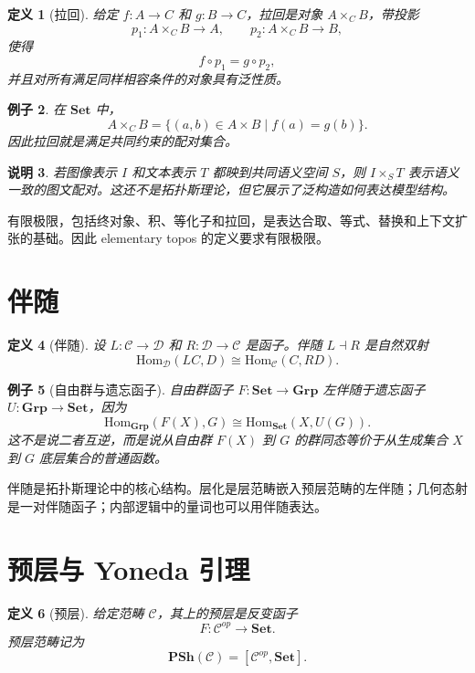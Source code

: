 \documentclass[UTF8,11pt,fontset=none]{ctexart}
\newtheorem{definition}{定义}[section]
\newtheorem{remark}[definition]{说明}
\newtheorem{example}[definition]{例子}
\newcommand{\Set}{\mathbf{Set}}
\newcommand{\Grp}{\mathbf{Grp}}
\newcommand{\PSh}{\mathbf{PSh}}
\newcommand{\Hom}{\mathrm{Hom}}
\begin{document}
\begin{definition}[拉回]
给定 \(f:A\to C\) 和 \(g:B\to C\)，拉回是对象 \(A\times_C B\)，带投影
\[
p_1:A\times_C B\to A,\qquad p_2:A\times_C B\to B,
\]
使得
\[
f\circ p_1=g\circ p_2,
\]
并且对所有满足同样相容条件的对象具有泛性质。
\end{definition}

\begin{example}
在 \(\Set\) 中，
\[
A\times_C B=\{(a,b)\in A\times B\mid f(a)=g(b)\}.
\]
因此拉回就是满足共同约束的配对集合。
\end{example}

\begin{remark}
若图像表示 \(I\) 和文本表示 \(T\) 都映到共同语义空间 \(S\)，则 \(I\times_S T\) 表示语义一致的图文配对。这还不是拓扑斯理论，但它展示了泛构造如何表达模型结构。
\end{remark}

有限极限，包括终对象、积、等化子和拉回，是表达合取、等式、替换和上下文扩张的基础。因此 elementary topos 的定义要求有限极限。

\section{伴随}

\begin{definition}[伴随]
设 \(L:\mathcal C\to\mathcal D\) 和 \(R:\mathcal D\to\mathcal C\) 是函子。伴随 \(L\dashv R\) 是自然双射
\[
\Hom_{\mathcal D}(LC,D)\cong \Hom_{\mathcal C}(C,RD).
\]
\end{definition}

\begin{example}[自由群与遗忘函子]
自由群函子 \(F:\Set\to\Grp\) 左伴随于遗忘函子 \(U:\Grp\to\Set\)，因为
\[
\Hom_{\Grp}(F(X),G)\cong \Hom_{\Set}(X,U(G)).
\]
这不是说二者互逆，而是说从自由群 \(F(X)\) 到 \(G\) 的群同态等价于从生成集合 \(X\) 到 \(G\) 底层集合的普通函数。
\end{example}

伴随是拓扑斯理论中的核心结构。层化是层范畴嵌入预层范畴的左伴随；几何态射是一对伴随函子；内部逻辑中的量词也可以用伴随表达。

\section{预层与 Yoneda 引理}

\begin{definition}[预层]
给定范畴 \(\mathcal C\)，其上的预层是反变函子
\[
F:\mathcal C^{op}\longrightarrow \Set.
\]
预层范畴记为
\[
\PSh(\mathcal C)=[\mathcal C^{op},\Set].
\]
\end{definition}
\end{document}

